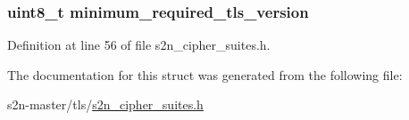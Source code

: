 \subsubsection[{\texorpdfstring{minimum\+\_\+required\+\_\+tls\+\_\+version}{minimum_required_tls_version}}]{\setlength{\rightskip}{0pt plus 5cm}uint8\+\_\+t minimum\+\_\+required\+\_\+tls\+\_\+version}\hypertarget{structs2n__cipher__suite_a5ab3744bc363b23e4a905125862c375a}{}\label{structs2n__cipher__suite_a5ab3744bc363b23e4a905125862c375a}


Definition at line 56 of file s2n\+\_\+cipher\+\_\+suites.\+h.



The documentation for this struct was generated from the following file\+:\begin{DoxyCompactItemize}
\item 
s2n-\/master/tls/\hyperlink{s2n__cipher__suites_8h}{s2n\+\_\+cipher\+\_\+suites.\+h}\end{DoxyCompactItemize}
